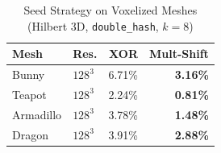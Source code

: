 \begin{table}[htbp]
\centering
\caption{Seed Strategy on Voxelized Meshes (Hilbert 3D, \texttt{double\_hash}, $k=8$)}
\label{tab:seed-voxel}
\begin{tabular}{@{}llrr@{}}
\toprule
Mesh & Res. & XOR & Mult-Shift \\
\midrule
Bunny & $128^3$ & 6.71\% & \textbf{3.16\%} \\
Teapot & $128^3$ & 2.24\% & \textbf{0.81\%} \\
Armadillo & $128^3$ & 3.78\% & \textbf{1.48\%} \\
Dragon & $128^3$ & 3.91\% & \textbf{2.88\%} \\
\bottomrule
\end{tabular}
\end{table}